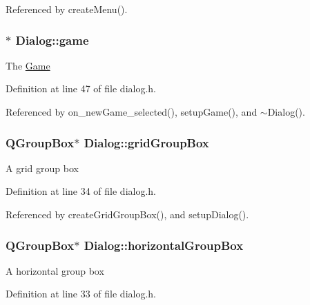 Referenced by create\-Menu().

\hypertarget{class_dialog_a1b67d47768a815f0b2824957bd955c49}{
\subsubsection[{game}]{$\ast$ Dialog\-::game\hspace{0.3cm}{\ttfamily [private]}}}\label{class_dialog_a1b67d47768a815f0b2824957bd955c49}
The \hyperlink{class_game}{Game} 

Definition at line 47 of file dialog.\-h.



Referenced by on\-\_\-new\-Game\-\_\-selected(), setup\-Game(), and $\sim$\-Dialog().

\hypertarget{class_dialog_a93c838af40eaab2aecbc11f4ec2f3680}{
\subsubsection[{grid\-Group\-Box}]{\setlength{\rightskip}{0pt plus 5cm}Q\-Group\-Box$\ast$ Dialog\-::grid\-Group\-Box\hspace{0.3cm}{\ttfamily [private]}}}\label{class_dialog_a93c838af40eaab2aecbc11f4ec2f3680}
A grid group box 

Definition at line 34 of file dialog.\-h.



Referenced by create\-Grid\-Group\-Box(), and setup\-Dialog().

\hypertarget{class_dialog_a382454f1112e8cf8823979456823e9fc}{
\subsubsection[{horizontal\-Group\-Box}]{\setlength{\rightskip}{0pt plus 5cm}Q\-Group\-Box$\ast$ Dialog\-::horizontal\-Group\-Box\hspace{0.3cm}{\ttfamily [private]}}}\label{class_dialog_a382454f1112e8cf8823979456823e9fc}
A horizontal group box 

Definition at line 33 of file dialog.\-h.



